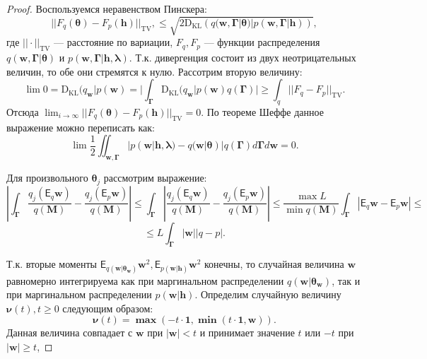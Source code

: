 \begin{proof}
Воспользуемся неравенством Пинскера:
\[
    ||F_q(\boldsymbol{\theta})-F_p(\mathbf{h})||_\text{TV},\leq\sqrt{2\text{D}_\text{KL}\left(q(\mathbf{w}, \boldsymbol{\Gamma}|\boldsymbol{\theta})|p(\mathbf{w}, \boldsymbol{\Gamma}|\mathbf{h})\right)},
\]
где $||\cdot||_\text{TV}$ --- расстояние по вариации, $F_q, F_p$ --- функции распределения   $q(\mathbf{w},\boldsymbol{\Gamma}|\boldsymbol{\theta})$ и $p(\mathbf{w},\boldsymbol{\Gamma}| \mathbf{h}, \boldsymbol{\lambda})$.
Т.к. дивергенция состоит из двух неотрицательных величин, то обе они стремятся к нулю.
Рассотрим вторую величину:
\[
   \lim 0 = \text{D}_\text{KL}(q_\mathbf{w}|p(\mathbf{w}) = |\int_{\boldsymbol{\Gamma}} \text{D}_\text{KL}(q_\mathbf{w}|p(\mathbf{w})q(\boldsymbol{\Gamma})| \geq \int_{q} ||F_q - F_p||_\text{TV}.  
\]
Отсюда $ \lim_{i \to \infty} ||F_q(\boldsymbol{\theta})-F_p(\mathbf{h})||_\text{TV} = 0.$
По теореме Шеффе данное выражение можно переписать как:
\[
    \lim \frac{1}{2}\iint_{\mathbf{w},\boldsymbol{\Gamma}} |p(\mathbf{w}| \mathbf{h}, \boldsymbol{\lambda}) -  q(\mathbf{w}|\boldsymbol{\theta})|q(\boldsymbol{\Gamma}) d\boldsymbol{\Gamma}d\mathbf{w} = 0.
\]

Для произвольного $\boldsymbol{\theta}_j$ рассмотрим выражение:
\[
    |\int_{\boldsymbol{\Gamma}} \frac{q_j(\mathsf{E}_q \mathbf{w})}{q(\mathbf{M})} -  \frac{q_j(\mathsf{E}_p \mathbf{w})}{{q(\mathbf{M})}}| \leq \int_{\boldsymbol{\Gamma}} |\frac{q_j(\mathsf{E}_q \mathbf{w})}{{q(\mathbf{M})}} -  \frac{q_j(\mathsf{E}_p \mathbf{w})}{{q(\mathbf{M})}}| \leq \frac{\max{L}}{\min q(\mathbf{M})}\int_{\boldsymbol{\Gamma}}  |\mathsf{E}_q \mathbf{w} - \mathsf{E}_p \mathbf{w}|  \leq
\]
\[
    \leq L\int_{\boldsymbol{\Gamma}} |\mathbf{w}| |q - p|.
\]

Т.к. вторые моменты $\mathsf{E}_{q(\mathbf{w}|\boldsymbol{\theta}_\mathbf{w})}\mathbf{w}^2,\mathsf{E}_{p(\mathbf{w}|\mathbf{h})}\mathbf{w}^2$ конечны, то случайная величина $\mathbf{w}$ равномерно интегрируема как при маргинальном распределении $q(\mathbf{w}|\boldsymbol{\theta}_\mathbf{w})$, так и при маргинальном распределении $p(\mathbf{w}|\mathbf{h})$.
Определим случайную величину $\boldsymbol{\nu}(t), t \geq 0$ следующим образом:
\[
    \boldsymbol{\nu}(t) = \boldsymbol{\max}(-t \cdot \mathbf{1}, \boldsymbol{\min}(t \cdot \mathbf{1}, \mathbf{w})).
\]
Данная величина совпадает с $\mathbf{w}$ при $|\mathbf{w}| < t$ и принимает значение $t$ или $-t$ при $|\mathbf{w}| \geq t$,


\end{proof}
